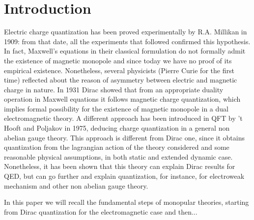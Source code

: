 \documentclass[main.tex]{subfiles}
\begin{document}
\section{Introduction}
Electric charge quantization has been proved experimentally by R.A. Millikan in 1909: from that date, all the experiments that followed confirmed this hypothesis.
In fact, Maxwell's equations in their classical formulation do not formally admit the existence of magnetic monopole and since today we have no proof of its empirical existence.
Nonetheless, several physicists (Pierre Curie for the first time) reflected about the reason of asymmetry between electric and magnetic charge in nature.
In 1931 Dirac showed that from an appropriate duality operation in Maxwell equations it follows magnetic charge quantization, which implies formal possibility for the existence of magnetic monopole in a dual electromagnetic theory.
A different approach has been introduced in QFT by 't Hooft and Poljakov in 1975, deducing charge quantization in a general non abelian gauge theory.
This approach is different from Dirac one, since it obtains quantization from the lagrangian action of the theory considered and some reasonable physical assumptions, in both static and extended dynamic case.
Nonetheless, it has been shown that this theory can explain Dirac results for QED, but can go further and explain quantization, for instance, for electroweak mechanism and other non abelian gauge theory.

In this paper we will recall the fundamental steps of monopular theories, starting from Dirac quantization for the electromagnetic case and then...
\end{document}
